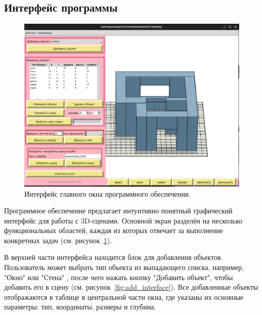 \subsection{Интерфейс программы}

\begin{figure}[H]
    \centering
    \includegraphics[width=1\textwidth]{img/example_light_10_0_0_camera_60_180_0.png}
    \caption{Интерфейс главного окна программного обеспечения.}
    \label{fig:main_interface}
\end{figure}

Программное обеспечение предлагает интуитивно понятный графический интерфейс для работы с 3D-сценами. Основной экран разделён на несколько функциональных областей, каждая из которых отвечает за выполнение конкретных задач (см. рисунок~\ref{fig:main_interface}).

В верхней части интерфейса находится блок для добавления объектов. Пользователь может выбрать тип объекта из выпадающего списка, например, "Окно" или "Стена" , после чего нажать кнопку "Добавить объект", чтобы добавить его в сцену (см. рисунок~\ref{fig:add_interface}). Все добавленные объекты отображаются в таблице в центральной части окна, где указаны их основные параметры: тип, координаты, размеры и глубина.

